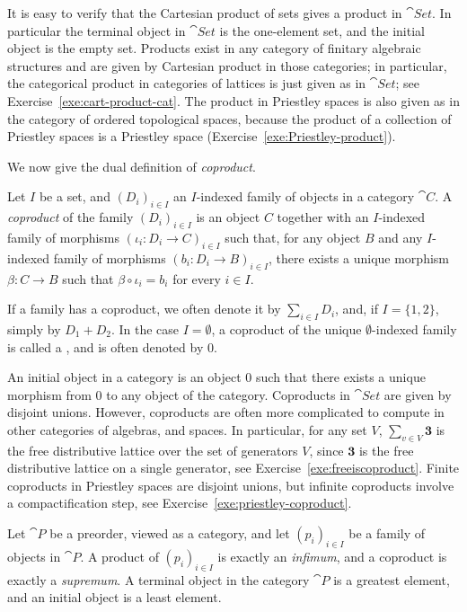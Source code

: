 It is easy to verify that the Cartesian product of sets gives a product in $\cat{Set}$. In particular the terminal object in $\cat{Set}$ is the one-element set, and the initial object is the empty set. 
Products exist in any category of finitary algebraic structures and are given by Cartesian product in those categories; in particular, the categorical product in categories of lattices is just given as in $\cat{Set}$; see Exercise~\ref{exe:cart-product-cat}. The product in Priestley spaces is also given as in the category of ordered topological spaces, because the product of a collection of Priestley spaces is a Priestley space (Exercise~\ref{exe:Priestley-product}).

We now give the dual definition of \emph{coproduct}. 
\begin{definition}\label{def:coproduct}
  Let $I$ be a set, and $(D_i)_{i \in I}$ an $I$-indexed family of objects in a category $\cat{C}$. %
A \emph{coproduct} of the family $(D_i)_{i \in I}$ is an object $C$ together with an $I$-indexed family of morphisms $(\iota_i \colon D_i \to C)_{i \in I}$ such that, for any object $B$ and any $I$-indexed family of morphisms $(b_i \colon D_i \to B)_{i \in I}$, there exists a unique morphism $\beta \colon C \to B$ such that $\beta \circ \iota_i = b_i$ for every $i \in I$.

If a family has a coproduct, we often denote it by $\sum_{i \in I}D_i$, and, if $I = \{1, 2\}$, simply by $D_1 + D_2$. In the case $I = \emptyset$, a coproduct of the unique $\emptyset$-indexed family is called a , and is often denoted by $0$. %
  \end{definition}
  An initial object in a category is an object $0$ such that there exists a unique morphism from $0$ to any object of the category.
Coproducts in $\cat{Set}$ are given by disjoint unions. However, coproducts are often more complicated to compute in other categories of algebras, and spaces. In particular, for any set $V$, $\sum_{v \in V} \mathbf{3}$ is the free distributive lattice over the set of generators $V$, since $\mathbf{3}$ is the free distributive lattice on a single generator, see Exercise~\ref{exe:freeiscoproduct}. Finite coproducts in Priestley spaces are disjoint unions, but infinite coproducts involve a compactification step, see Exercise~\ref{exe:priestley-coproduct}. 

\begin{example}\label{exa:prod-as-meet}
Let $\cat{P}$ be a preorder, viewed as a category, and let $(p_i)_{i \in I}$ be a family of objects in $\cat{P}$. A product of $(p_i)_{i \in I}$ is exactly an \emph{infimum}, and  a coproduct  is exactly a \emph{supremum}. A terminal object in the category $\cat{P}$ is a greatest element, and an initial object is a least element.
\end{example}

